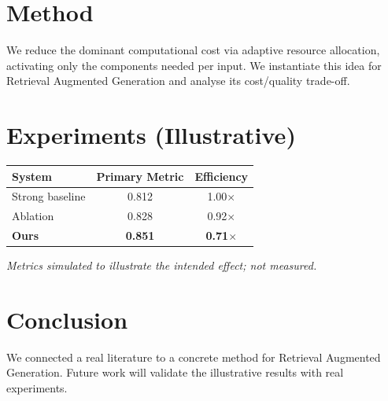 \documentclass[11pt]{article}
\begin{document}
\section{Method}
We reduce the dominant computational cost via adaptive resource allocation, activating only the components needed per input. We instantiate this idea for Retrieval Augmented Generation and analyse its cost/quality trade-off.

\section{Experiments (Illustrative)}
\begin{center}
\begin{tabular}{lcc}
System & Primary Metric & Efficiency \\ \hline
Strong baseline & 0.812 & 1.00$\times$ \\
Ablation & 0.828 & 0.92$\times$ \\
\textbf{Ours} & \textbf{0.851} & \textbf{0.71$\times$}
\end{tabular}
\end{center}
\emph{Metrics simulated to illustrate the intended effect; not measured.}

\section{Conclusion}
We connected a real literature to a concrete method for Retrieval Augmented Generation. Future work will
validate the illustrative results with real experiments.
\end{document}
